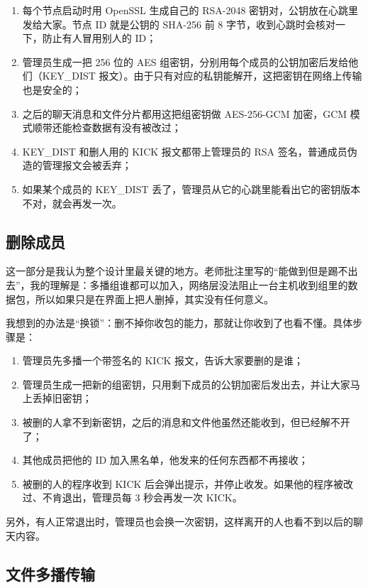 \documentclass[a4paper,zihao=-4]{ctexart}
\begin{document}
\begin{enumerate}
  \item 每个节点启动时用 OpenSSL 生成自己的 RSA-2048 密钥对，公钥放在心跳里发给大家。节点 ID 就是公钥的 SHA-256 前 8 字节，收到心跳时会核对一下，防止有人冒用别人的 ID；
  \item 管理员生成一把 256 位的 AES 组密钥，分别用每个成员的公钥加密后发给他们（KEY\_DIST 报文）。由于只有对应的私钥能解开，这把密钥在网络上传输也是安全的；
  \item 之后的聊天消息和文件分片都用这把组密钥做 AES-256-GCM 加密，GCM 模式顺带还能检查数据有没有被改过；
  \item KEY\_DIST 和删人用的 KICK 报文都带上管理员的 RSA 签名，普通成员伪造的管理报文会被丢弃；
  \item 如果某个成员的 KEY\_DIST 丢了，管理员从它的心跳里能看出它的密钥版本不对，就会再发一次。
\end{enumerate}

\subsection{删除成员}

这一部分是我认为整个设计里最关键的地方。老师批注里写的“能做到但是踢不出去”，我的理解是：多播组谁都可以加入，网络层没法阻止一台主机收到组里的数据包，所以如果只是在界面上把人删掉，其实没有任何意义。

我想到的办法是“换锁”：删不掉你收包的能力，那就让你收到了也看不懂。具体步骤是：

\begin{enumerate}
  \item 管理员先多播一个带签名的 KICK 报文，告诉大家要删的是谁；
  \item 管理员生成一把新的组密钥，只用剩下成员的公钥加密后发出去，并让大家马上丢掉旧密钥；
  \item 被删的人拿不到新密钥，之后的消息和文件他虽然还能收到，但已经解不开了；
  \item 其他成员把他的 ID 加入黑名单，他发来的任何东西都不再接收；
  \item 被删的人的程序收到 KICK 后会弹出提示，并停止收发。如果他的程序被改过、不肯退出，管理员每 3 秒会再发一次 KICK。
\end{enumerate}

另外，有人正常退出时，管理员也会换一次密钥，这样离开的人也看不到以后的聊天内容。

\subsection{文件多播传输}
\end{document}
